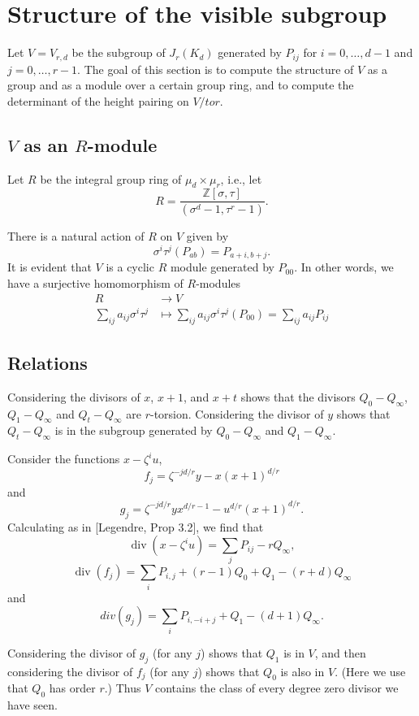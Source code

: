 \documentclass[reqno]{amsart}
\theoremstyle{definition}
\theoremstyle{remark}
\DeclareMathOperator{\dvsr}{div}
\def\Z{\mathbb{Z}}
\begin{document}
\section{Structure of the visible subgroup}
Let $V=V_{r,d}$ be the subgroup of $J_r(K_d)$ generated by $P_{ij}$
for $i=0,\dots,d-1$ and $j=0,\dots,r-1$.  The goal of this section is
to compute the structure of $V$ as a group and as a module over
a certain group ring, and to compute the determinant of the height
pairing on $V/tor$.

\subsection{$V$ as an $R$-module}
Let $R$ be the integral group ring of $\mu_d\times\mu_r$, i.e., let
$$R=\frac{\Z[\sigma,\tau]}{(\sigma^d-1,\tau^r-1)}.$$

There is a natural action of $R$ on $V$ given by 
$$\sigma^i\tau^j(P_{ab})=P_{a+i,b+j}.$$
It is evident that $V$ is a cyclic $R$ module generated by $P_{00}$.
In other words, we have a surjective homomorphism of $R$-modules
\begin{align*}
R&\to V\\
\sum_{ij}a_{ij}\sigma^i\tau^j&\mapsto
\sum_{ij}a_{ij}\sigma^i\tau^j(P_{00})
=\sum_{ij}a_{ij} P_{ij}
\end{align*}


\subsection{Relations}
Considering the divisors of $x$, $x+1$, and $x+t$ shows that the
divisors $Q_0-Q_\infty$, $Q_1-Q_\infty$ and $Q_t-Q_\infty$ are
$r$-torsion.  Considering the divisor of $y$ shows that $Q_t-Q_\infty$ is in
the subgroup generated by $Q_0-Q_\infty$ and $Q_1-Q_\infty$.  

Consider the functions $x-\zeta^iu$, 
$$f_j=\zeta^{-jd/r}y-x(x+1)^{d/r}$$
and 
$$g_j=\zeta^{-jd/r}yx^{d/r-1}-u^{d/r}(x+1)^{d/r}.$$
Calculating as in [Legendre, Prop 3.2], we find that
$$\dvsr(x-\zeta^iu)=\sum_j P_{ij}-rQ_\infty,$$
$$\dvsr(f_j)=\sum_iP_{i,j}+(r-1)Q_0+Q_1-(r+d)Q_\infty$$
and
$$div(g_j)=\sum_iP_{i,-i+j}+Q_1-(d+1)Q_\infty.$$

Considering the divisor of $g_j$ (for any $j$) shows that $Q_1$ is in
$V$, and then considering the divisor of $f_j$ (for any $j$) shows
that $Q_0$ is also in $V$.  (Here we use that $Q_0$ has order $r$.)  
Thus $V$ contains the class of every degree zero divisor we have
seen.
\end{document}
